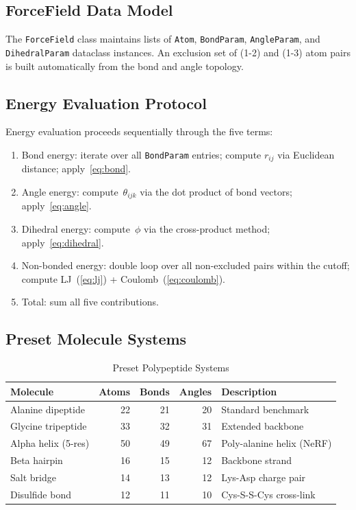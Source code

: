 \documentclass[conference]{IEEEtran}
\begin{document}
\subsection{ForceField Data Model}

The \texttt{ForceField} class maintains lists of \texttt{Atom},
\texttt{BondParam}, \texttt{AngleParam}, and \texttt{DihedralParam} dataclass
instances.  An exclusion set of (1-2) and (1-3) atom pairs is built
automatically from the bond and angle topology.

\subsection{Energy Evaluation Protocol}

Energy evaluation proceeds sequentially through the five terms:
\begin{enumerate}
    \item Bond energy: iterate over all \texttt{BondParam} entries; compute
          $r_{ij}$ via Euclidean distance; apply~\cref{eq:bond}.
    \item Angle energy: compute~$\theta_{ijk}$ via the dot product of bond
          vectors; apply~\cref{eq:angle}.
    \item Dihedral energy: compute~$\phi$ via the cross-product method;
          apply~\cref{eq:dihedral}.
    \item Non-bonded energy: double loop over all non-excluded pairs within
          the cutoff; compute LJ~(\cref{eq:lj}) + Coulomb~(\cref{eq:coulomb}).
    \item Total: sum all five contributions.
\end{enumerate}

\subsection{Preset Molecule Systems}

\begin{table}[H]
\centering
\caption{Preset Polypeptide Systems}
\label{tab:presets}
\begin{tabular}{@{}lrrrl@{}}
\toprule
Molecule & Atoms & Bonds & Angles & Description \\
\midrule
Alanine dipeptide   & 22 & 21 & 20 & Standard benchmark \\
Glycine tripeptide  & 33 & 32 & 31 & Extended backbone \\
Alpha helix (5-res) & 50 & 49 & 67 & Poly-alanine helix (NeRF) \\
Beta hairpin        & 16 & 15 & 12 & Backbone strand \\
Salt bridge         & 14 & 13 & 12 & Lys-Asp charge pair \\
Disulfide bond      & 12 & 11 & 10 & Cys-S-S-Cys cross-link \\
\bottomrule
\end{tabular}
\end{table}
\end{document}
